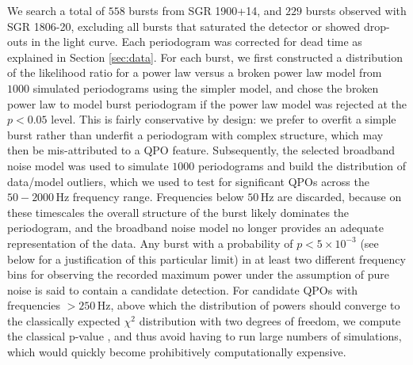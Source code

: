 \documentclass[numberedappendix]{emulateapj}
\newcommand{\hz}{\,\mathrm{Hz}}
\begin{document}
We search a total of $558$ bursts from SGR 1900+14, and $229$ bursts observed with SGR 1806-20, excluding all bursts that saturated the detector or showed drop-outs in the light curve. 
Each periodogram was corrected for dead time as explained in Section \ref{sec:data}. 
For each burst, we first constructed a distribution of the likelihood ratio for a power law versus a broken power law model from $1000$ simulated periodograms using the simpler model, and
chose the broken power law to model burst periodogram if the power law model was rejected at the $p < 0.05$ level. This is fairly conservative by design: we prefer to overfit a simple burst rather than underfit a periodogram 
with complex structure, which may then be mis-attributed to a QPO feature. Subsequently, the selected broadband noise model was used to simulate $1000$ periodograms and build the
distribution of data/model outliers, which we used to test for significant QPOs across the $50 - 2000 \hz$ frequency range. Frequencies below $50 \, \mathrm{Hz}$ are discarded, because on these timescales the overall structure of
the burst likely dominates the periodogram, and the broadband noise model no longer provides an adequate representation of the data. Any burst with a probability of $p < 5 \times 10^{-3}$ (see below for a justification of this particular limit) in at least two different frequency bins
for observing the recorded maximum power under the assumption of pure noise is said to contain a candidate detection. For candidate QPOs with frequencies $> 250 \hz$, above which the distribution of powers
should converge to the classically expected $\chi^2$ distribution with two degrees of freedom, we compute the classical p-value \citep{groth1975}, and thus avoid having to run large numbers of simulations, which 
would quickly become prohibitively computationally expensive. 
\end{document}
